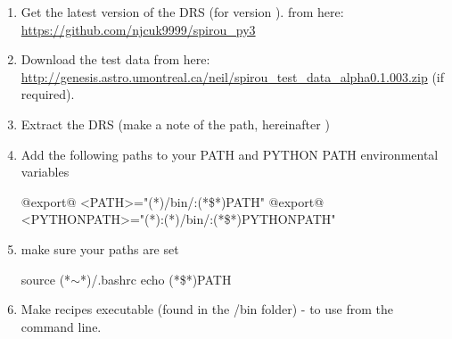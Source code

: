 \begin{enumerate}

\item Get the latest version of the DRS (for \instrument version \MyCodeVersion). from here: \url{https://github.com/njcuk9999/spirou_py3}

\item Download the test data from here: \url{http://genesis.astro.umontreal.ca/neil/spirou_test_data_alpha0.1.003.zip} (if required).

\item Extract the DRS (make a note of the path, hereinafter \InstallDIR)

\item Add the following paths to your PATH and PYTHON PATH environmental variables

	\begin{bashbox}[title={e.g. in $\sim$/.bashrc}]
	@export@ <PATH>="(*\InstallDIR*)/bin/:{(*\$*)PATH}"
	@export@ <PYTHONPATH>="(*\InstallDIR*):(*\InstallDIR*)/bin/:{(*\$*)PYTHONPATH}"
	\end{bashbox}

\item make sure your paths are set
	\begin{cmdbox}
	source (*$\sim$*)/.bashrc
	echo (*\$*)PATH
	\end{cmdbox}

\item Make recipes executable (found in the \InstallDIR/bin folder) - to use from the command line.


\end{enumerate}
